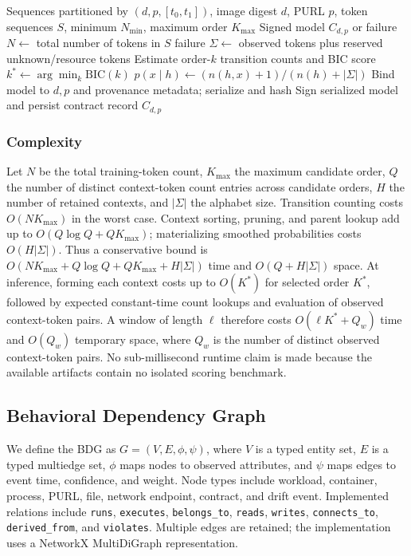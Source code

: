 \documentclass[conference]{IEEEtran}
\begin{document}
\begin{algorithm}[t]\caption{Behavioral contract construction}\label{alg:contract}\begin{algorithmic}[1]
\Require Sequences partitioned by $(d,p,[t_0,t_1])$, image digest $d$, PURL $p$, token sequences $S$, minimum $N_{\min}$, maximum order $K_{\max}$
\Ensure Signed model $C_{d,p}$ or failure
\State $N \gets$ total number of tokens in $S$
\State \Return failure\EndIf
\State $\Sigma \gets$ observed tokens plus reserved unknown/resource tokens
\State Estimate order-$k$ transition counts and BIC score\EndFor
\State $k^* \gets \arg\min_k \mathrm{BIC}(k)$
\State $\hat p(x\mid h) \gets (n(h,x)+1)/(n(h)+|\Sigma|)$\EndFor
\State Bind model to $d,p$ and provenance metadata; serialize and hash
\State Sign serialized model and persist contract record
\State \Return $C_{d,p}$
\end{algorithmic}\end{algorithm}

\subsubsection{Complexity}
Let $N$ be the total training-token count, $K_{\max}$ the maximum candidate order, $Q$ the number of distinct context-token count entries across candidate orders, $H$ the number of retained contexts, and $|\Sigma|$ the alphabet size. Transition counting costs $O(NK_{\max})$ in the worst case. Context sorting, pruning, and parent lookup add up to $O(Q\log Q+QK_{\max})$; materializing smoothed probabilities costs $O(H|\Sigma|)$. Thus a conservative bound is $O(NK_{\max}+Q\log Q+QK_{\max}+H|\Sigma|)$ time and $O(Q+H|\Sigma|)$ space. At inference, forming each context costs up to $O(K^*)$ for selected order $K^*$, followed by expected constant-time count lookups and evaluation of observed context-token pairs. A window of length $\ell$ therefore costs $O(\ell K^*+Q_w)$ time and $O(Q_w)$ temporary space, where $Q_w$ is the number of distinct observed context-token pairs. No sub-millisecond runtime claim is made because the available artifacts contain no isolated scoring benchmark.

\subsection{Behavioral Dependency Graph}
We define the BDG as $G=(V,E,\phi,\psi)$, where $V$ is a typed entity set, $E$ is a typed multiedge set, $\phi$ maps nodes to observed attributes, and $\psi$ maps edges to event time, confidence, and weight. Node types include workload, container, process, PURL, file, network endpoint, contract, and drift event. Implemented relations include \texttt{runs}, \texttt{executes}, \texttt{belongs\_to}, \texttt{reads}, \texttt{writes}, \texttt{connects\_to}, \texttt{derived\_from}, and \texttt{violates}. Multiple edges are retained; the implementation uses a NetworkX MultiDiGraph representation.
\end{document}
